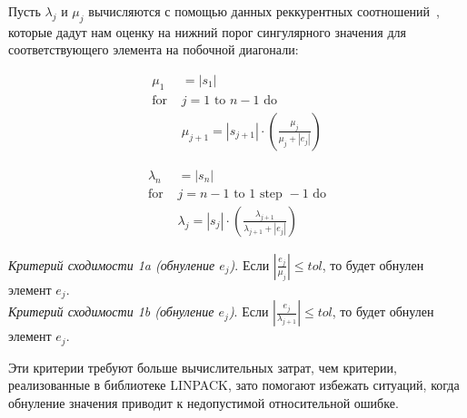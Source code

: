 Пусть $\lambda_j$ и $\mu_j$ вычисляются с помощью данных реккурентных соотношений~\cite{Demmel1990}, которые дадут нам оценку на нижний порог сингулярного значения для соответствующего элемента на побочной диагонали:

\begin{minipage}{0.48\textwidth}
\begin{align*}
\mu_1& = |s_1| \\
\text{for }& j = 1 \text{ to } n-1 \text{ do} \\
&\mu_{j+1} = |s_{j+1}| \cdot \left( \frac{\mu_j}{\mu_j + |e_j|} \right)
\end{align*}
\end{minipage}
\hfill
\begin{minipage}{0.48\textwidth}
\begin{align*}
\lambda_n& = |s_n| \\
\text{for }& j = n-1 \text{ to } 1 \text{ step } -1 \text{ do} \\
&\lambda_j = |s_j| \cdot \left( \frac{\lambda_{j+1}}{\lambda_{j+1} + |e_j|} \right)
\end{align*}
\end{minipage}
\vspace{1em}

\noindent\textit{Критерий сходимости 1a (обнуление $e_j$)}. Если $|\frac{e_j}{\mu_j}|\leq tol$, то будет обнулен элемент $e_j$.\vspace{1em}
\\\textit{Критерий сходимости 1b (обнуление $e_j$)}. Если $|\frac{e_j}{\lambda_{j+1}}|\leq tol$, то будет обнулен элемент $e_j$.\vspace{1em}

Эти критерии требуют больше вычислительных затрат, чем критерии, реализованные в библиотеке LINPACK, зато помогают избежать ситуаций, когда обнуление значения приводит к недопустимой относительной ошибке.

